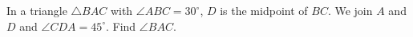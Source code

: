 In a triangle $\triangle BAC$ with $\angle ABC=30^\circ$, $D$ is the midpoint of $BC$. We join $A$ and $D$ and $\angle CDA = 45^\circ$. Find $\angle BAC$.
